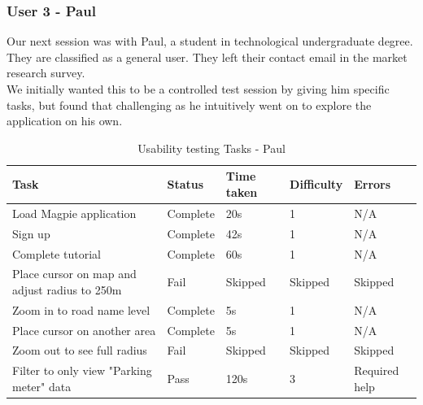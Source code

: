 \newpage
\subsubsection{User 3 - Paul}
Our next session was with Paul, a student in technological undergraduate degree. They are classified as a general user. They left their contact email in the market research survey.\\
We initially wanted this to be a controlled test session by giving him specific tasks, but found that challenging as he intuitively went on to explore the application on his own.
\begin{table}[h!]
    \centering
    \caption{Usability testing Tasks - Paul}
    \begin{tabular}{|p{}|p{}|p{}|p{}|p{}|}
        \hline
        \textbf{Task}                                 & \textbf{Status} & \textbf{Time taken} & \textbf{Difficulty} & \textbf{Errors}    \\
        \hline
        Load Magpie application                       & Complete        & 20s                 & 1                   & N/A                \\
        \hline
        Sign up                                       & Complete        & 42s                 & 1                   & N/A                \\
        \hline
        Complete tutorial                             & Complete        & 60s                 & 1                   & N/A                \\
        \hline
        Place cursor on map and adjust radius to 250m & Fail            & Skipped             & Skipped             & Skipped            \\
        \hline
        Zoom in to road name level                    & Complete        & 5s                  & 1                   & N/A                \\
        \hline
        Place cursor on another area                  & Complete        & 5s                  & 1                   & N/A                \\
        \hline
        Zoom out to see full radius                   & Fail            & Skipped             & Skipped             & Skipped            \\
        \hline
        Filter to only view "Parking meter" data      & Pass            & 120s                & 3                   & Required help      \\

\end{tabular}
\end{table}
